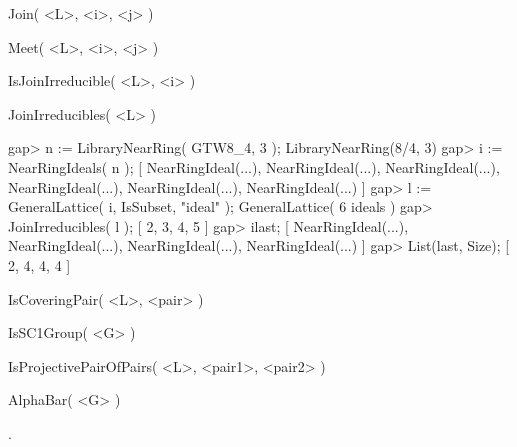 \>Join( <L>, <i>, <j> )

\>Meet( <L>, <i>, <j> )

\>IsJoinIrreducible( <L>, <i> )

\>JoinIrreducibles( <L> )

\beginexample
    gap> n := LibraryNearRing( GTW8_4, 3 );
    LibraryNearRing(8/4, 3)
    gap> i := NearRingIdeals( n );
    [ NearRingIdeal(...), NearRingIdeal(...), NearRingIdeal(...), 
      NearRingIdeal(...), NearRingIdeal(...), NearRingIdeal(...) ]
    gap> l := GeneralLattice( i, IsSubset, "ideal" );
    GeneralLattice( 6 ideals )
    gap> JoinIrreducibles( l );
    [ 2, 3, 4, 5 ]
    gap> i{last};
    [ NearRingIdeal(...), NearRingIdeal(...), NearRingIdeal(...), 
      NearRingIdeal(...) ]
    gap> List(last, Size);
    [ 2, 4, 4, 4 ]
\endexample

\>IsCoveringPair( <L>, <pair> )

\>IsSC1Group( <G> )

\>IsProjectivePairOfPairs( <L>, <pair1>, <pair2> )

\>AlphaBar( <G> )

.









